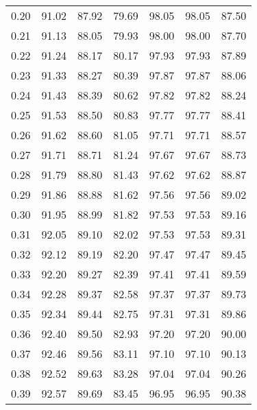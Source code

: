 \begin{tabular}{|c|c|c|c|c|c|c|}
      0.20 &     91.02 &     87.92 &      79.69 &   98.05 &      98.05 &         87.50 \\
      0.21 &     91.13 &     88.05 &      79.93 &   98.00 &      98.00 &         87.70 \\
      0.22 &     91.24 &     88.17 &      80.17 &   97.93 &      97.93 &         87.89 \\
      0.23 &     91.33 &     88.27 &      80.39 &   97.87 &      97.87 &         88.06 \\
      0.24 &     91.43 &     88.39 &      80.62 &   97.82 &      97.82 &         88.24 \\
      0.25 &     91.53 &     88.50 &      80.83 &   97.77 &      97.77 &         88.41 \\
      0.26 &     91.62 &     88.60 &      81.05 &   97.71 &      97.71 &         88.57 \\
      0.27 &     91.71 &     88.71 &      81.24 &   97.67 &      97.67 &         88.73 \\
      0.28 &     91.79 &     88.80 &      81.43 &   97.62 &      97.62 &         88.87 \\
      0.29 &     91.86 &     88.88 &      81.62 &   97.56 &      97.56 &         89.02 \\
      0.30 &     91.95 &     88.99 &      81.82 &   97.53 &      97.53 &         89.16 \\
      0.31 &     92.05 &     89.10 &      82.02 &   97.53 &      97.53 &         89.31 \\
      0.32 &     92.12 &     89.19 &      82.20 &   97.47 &      97.47 &         89.45 \\
      0.33 &     92.20 &     89.27 &      82.39 &   97.41 &      97.41 &         89.59 \\
      0.34 &     92.28 &     89.37 &      82.58 &   97.37 &      97.37 &         89.73 \\
      0.35 &     92.34 &     89.44 &      82.75 &   97.31 &      97.31 &         89.86 \\
      0.36 &     92.40 &     89.50 &      82.93 &   97.20 &      97.20 &         90.00 \\
      0.37 &     92.46 &     89.56 &      83.11 &   97.10 &      97.10 &         90.13 \\
      0.38 &     92.52 &     89.63 &      83.28 &   97.04 &      97.04 &         90.26 \\
      0.39 &     92.57 &     89.69 &      83.45 &   96.95 &      96.95 &         90.38 \\

\end{tabular}
